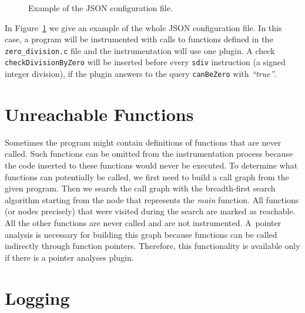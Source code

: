 
\begin{figure}[t]

\caption{Example of the JSON configuration file.}
\label{fig:all_config}
\end{figure}

In Figure~\ref{fig:all_config} we give an example of the whole JSON
configuration file. In this case, a program will be instrumented with calls to
functions defined in the \texttt{zero\_division.c} file and the instrumentation
will use one plugin. A check \texttt{checkDivisionByZero} will be inserted
before every \texttt{sdiv} instruction (a signed integer division), if the
plugin answers to the query \texttt{canBeZero} with \emph{``true''}.

\section{Unreachable Functions}

Sometimes the program might contain definitions of functions that are never
called. Such functions can be omitted from the instrumentation process because
the code inserted to these functions would never be executed. To determine what
functions can potentially be called, we first need to build a call graph from
the given program. Then we search the call graph with the breadth-first search
algorithm starting from the node that represents the \emph{main} function. All
functions (or nodes precisely) that were visited during the search are marked
as reachable. All the other functions are never called and are not
instrumented. A~pointer analysis is necessary for building this graph because
functions can be called indirectly through function pointers. Therefore, this
functionality is available only if there is a pointer analyses plugin.

\section{Logging}

